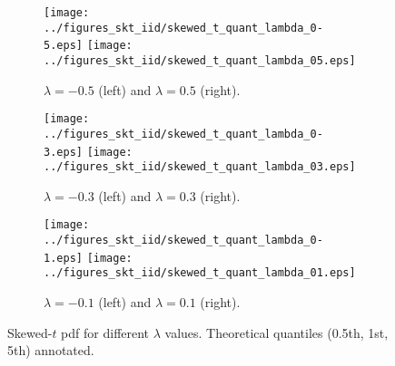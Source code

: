 \documentclass[a4paper,10pt]{article} %
\begin{document}
\begin{figure}
\centering
\begin{subfigure}{\linewidth}
\centering
\texttt{[image: ../figures\_skt\_iid/skewed\_t\_quant\_lambda\_0-5.eps]}
\texttt{[image: ../figures\_skt\_iid/skewed\_t\_quant\_lambda\_05.eps]}
\caption{$\lambda=-0.5$ (left) and $\lambda=0.5$ (right).} 
\end{subfigure}

\begin{subfigure}{\linewidth}
\centering
\texttt{[image: ../figures\_skt\_iid/skewed\_t\_quant\_lambda\_0-3.eps]}
\texttt{[image: ../figures\_skt\_iid/skewed\_t\_quant\_lambda\_03.eps]}
\caption{$\lambda=-0.3$ (left) and $\lambda=0.3$ (right).} 
\end{subfigure}

\begin{subfigure}{\linewidth}
\centering
\texttt{[image: ../figures\_skt\_iid/skewed\_t\_quant\_lambda\_0-1.eps]}
\texttt{[image: ../figures\_skt\_iid/skewed\_t\_quant\_lambda\_01.eps]}
\caption{$\lambda=-0.1$ (left) and $\lambda=0.1$ (right).} 
\end{subfigure}

\caption{Skewed-$t$ pdf for different $\lambda$ values. Theoretical quantiles (0.5th, 1st, 5th) annotated.}
\label{fig:skt_iid_pdf}
\end{figure}
 
\end{document}
